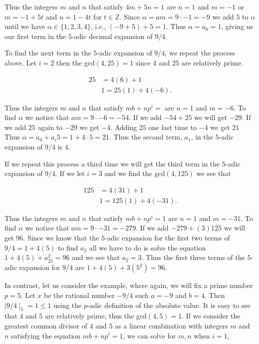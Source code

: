 \documentclass[12pt]{amsart}
\theoremstyle{plain}
\theoremstyle{definition}
\begin{document}
Thus the integers $m$ and $n$ that satisfy $4m + 5n = 1 $ are $n = 1$ and $m = -1$ or $m = -1 + 5t$ and $n = 1-4t$ for $ t \in \mathbb{Z}$. Since $\alpha = am = 9 \cdot -1 = -9$  we add $5$ to $\alpha$ until we have $\alpha \in \{1, 2, 3, 4 \}$, i.e., $(-9 + 5) + 5 = 1$.   Thus $\alpha = a_0 = 1$, giving us our first term in the $5$-adic decimal expansion of $9/4$.

To find the next term in the $5$-adic expansion of $9/4$, we repeat the process above. Let $i = 2$ then the gcd$(4, 25) = 1$ since $4$ and $25$ are relatively  prime.

\begin{align}
25 & = 4(6) + 1 \nonumber\\
&1 = 25(1) + 4(-6).\nonumber
\end{align}

Thus the integers $m$ and $n$ that satisfy $mb + np^i = $ are $n = 1$ and $m = -6$. To find $\alpha$ we notice that $am = 9 \cdot -6 = -54$. If we add $-54 + 25$ we will get $-29$. If we add $25$ again to $-29$ we get $-4$. Adding $25$ one last time to $-4$ we get $21$  Thus $\alpha = a_0 + a_i5 = 1 + 4 \cdot 5 = 21$.  Thus the second term, $a_1$, in the $5$-adic expansion of $9/4$ is $4$. 

If we repeat this process a third time we will get the third term in the $5$-adic expansion of $9/4$. If we let $i = 3$ and we find the gcd$(4, 125)$ we see that 

\begin{align}
125 & = 4(31) + 1 \nonumber\\
&1 = 125(1) + 4(-31) \nonumber.
\end{align}

Thus the integers $m$ and $n$ that satisfy $mb + np^i = 1 $ are $n = 1$ and $m = -31$. To find $\alpha$ we notice that $am = 9 \cdot -31 = -279$. If we add $-279 + (3) 125$ we will get $96$. Since we know that the $5$-adic expansion for the first two terms of $9/4 = 1+ 4(5)$ to find $a_2$ all we have to do is solve the equation $1 + 4(5) + a_25^2 = 96$ and we see that $a_2 = 3$. Thus the first three terms of the $5$-adic expansion for $9/4$ are $1 + 4(5) + 3(5^2) = 96$.



In contrast, let us consider the example, where again, we will fix a prime number $p = 5$.  Let $x$ be the rational number $-9/4$ such  $a = -9 $ and $b = 4$.  Then  $\mid 9/4 \mid_5 = 1 \le 1$ using the $p$-adic definition of the absolute value. It is easy to see that $4$ and $5$ are relatively prime, thus the  gcd$(4, 5) = 1$. If we consider the greatest common divisor of $4$ and $5$ as a linear combination with integers $m$ and $n$ satisfying the equation $mb + np^i = 1$, we can solve for $m,n$ when $i = 1$,
\end{document}
